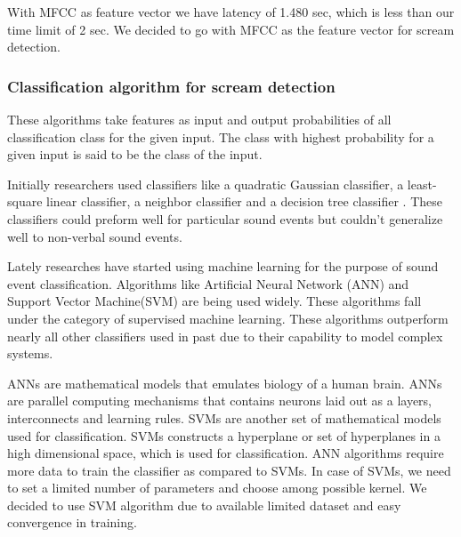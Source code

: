 With MFCC as feature vector we have latency of 1.480 sec, which is less than our time limit of 2 sec. We decided to go with MFCC as the feature vector for scream detection.

\subsubsection{Classification algorithm for scream detection}
\label{sssec:algoforscream} 

These algorithms take features as input and output probabilities of all classification class for the given input. The class with highest probability for a given input is said to be the class of the input.

Initially researchers used classifiers like a quadratic Gaussian classifier, a least-square
linear classifier, a neighbor classifier and a decision tree classifier \cite{paper6}. These classifiers could preform well for particular sound events but couldn't generalize well to non-verbal sound events.

Lately researches have started using machine learning for the purpose of sound event classification. Algorithms like Artificial Neural Network (ANN) \cite{paper6} and Support Vector Machine(SVM) \cite{paper10} are being used widely. These algorithms fall under the category of supervised machine learning. These algorithms outperform nearly all other classifiers used in past due to their capability to model complex systems.

ANNs are mathematical models that emulates biology of a human brain. ANNs are parallel computing mechanisms that contains neurons laid out as a layers, interconnects and learning rules. SVMs are another set of mathematical models used for classification. SVMs constructs a hyperplane or set of hyperplanes in a high dimensional space, which is used for classification. ANN algorithms require more data to train the classifier as compared to SVMs. In case of SVMs, we need to set a limited number of parameters and choose among possible kernel. We decided to use SVM algorithm due to available limited dataset and easy convergence in training. 